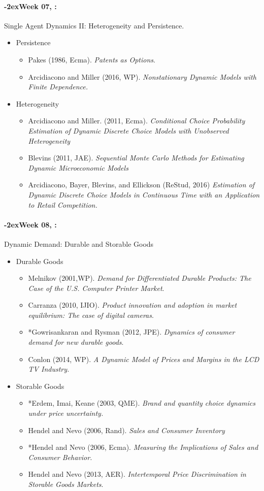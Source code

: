 \documentclass[11pt]{article}
\newcommand{\week}[1]{%
  \paragraph*{\kern-2ex\quad #1, \syldate{\today}:}%
  \ifdim\wd1=\wd\THURSDAY
    \AdvanceDate[7]
  \else
    \AdvanceDate[7]
  \fi%
}
\begin{document}
\week{Week 07} Single Agent Dynamics II: Heterogeneity and Persistence. 
\begin{itemize}
\item Persistence
\begin{itemize}
\item Pakes (1986, Ecma). \textit{Patents as Options}.
\item Arcidiacono and Miller (2016, WP). \textit{Nonstationary Dynamic Models with Finite Dependence.}
\end{itemize}
\item Heterogeneity
\begin{itemize}
\item Arcidiacono and Miller. (2011, Ecma). \textit{Conditional Choice Probability Estimation of Dynamic Discrete Choice Models with Unobserved Heterogeneity}
\item Blevins (2011, JAE). \textit{Sequential Monte Carlo Methods for Estimating Dynamic Microeconomic Models}
\item Arcidiacono, Bayer, Blevins, and Ellickson (ReStud, 2016) \textit{Estimation of Dynamic Discrete Choice Models in Continuous Time with an Application to Retail Competition.}
\end{itemize}
\end{itemize}

\week{Week 08} Dynamic Demand: Durable and Storable Goods
\begin{itemize}
\item Durable Goods
\begin{itemize}
\item Melnikov (2001,WP). \textit{Demand for Differentiated Durable Products: The Case of the U.S. Computer Printer Market}.
\item Carranza (2010, IJIO). \textit{Product innovation and adoption in market equilibrium: The case of digital cameras}.
\item *Gowrisankaran and Rysman (2012, JPE). \textit{Dynamics of consumer demand for new durable goods}.
\item Conlon (2014, WP). \textit{A Dynamic Model of Prices and Margins in the LCD TV Industry.}
\end{itemize}
\item Storable Goods
\begin{itemize}
\item *Erdem, Imai, Keane (2003, QME). \textit{Brand and quantity choice dynamics under price uncertainty.}
\item Hendel and Nevo (2006, Rand). \textit{Sales and Consumer Inventory}
\item *Hendel and Nevo (2006, Ecma). \textit{Measuring the Implications of Sales and Consumer Behavior.}
\item Hendel and Nevo (2013, AER). \textit{Intertemporal Price Discrimination in Storable Goods Markets}.
\end{itemize}
\end{itemize}
\end{document}
